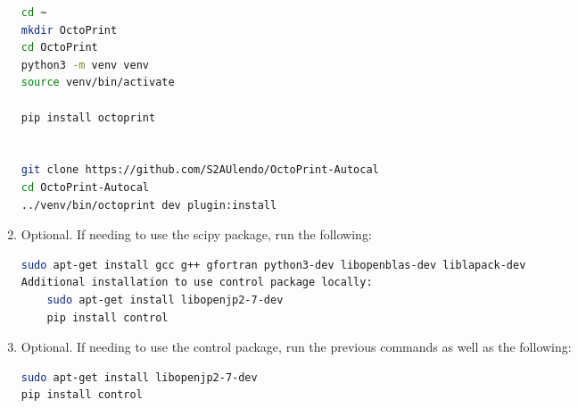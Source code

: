\documentclass[12pt]{article}
\begin{document}
\begin{enumerate}
\begin{lstlisting}[language=bash]
cd ~
mkdir OctoPrint
cd OctoPrint
python3 -m venv venv
source venv/bin/activate

pip install octoprint


git clone https://github.com/S2AUlendo/OctoPrint-Autocal
cd OctoPrint-Autocal
../venv/bin/octoprint dev plugin:install
\end{lstlisting}
	\item Optional. If needing to use the scipy package, run the following:
\begin{lstlisting}[language=bash]
sudo apt-get install gcc g++ gfortran python3-dev libopenblas-dev liblapack-dev
Additional installation to use control package locally:
 	sudo apt-get install libopenjp2-7-dev
	pip install control

\end{lstlisting}
	\item Optional. If needing to use the control package, run the previous commands as well as the following:
\begin{lstlisting}[language=bash]
sudo apt-get install libopenjp2-7-dev
pip install control
\end{lstlisting}


\end{enumerate}
\end{document}
